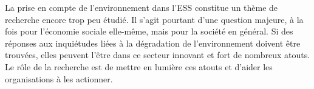 La prise en compte de l'environnement dans l'ESS constitue un thème de recherche encore trop peu étudié. Il s'agit pourtant d'une question majeure, à la fois pour l'économie sociale elle-même, mais pour la société en général. Si des réponses aux inquiétudes liées à la dégradation de l'environnement doivent être trouvées, elles peuvent l'être dans ce secteur innovant et fort de nombreux atouts. Le rôle de la recherche est de mettre en lumière ces atouts et d'aider les organisations à les actionner.  